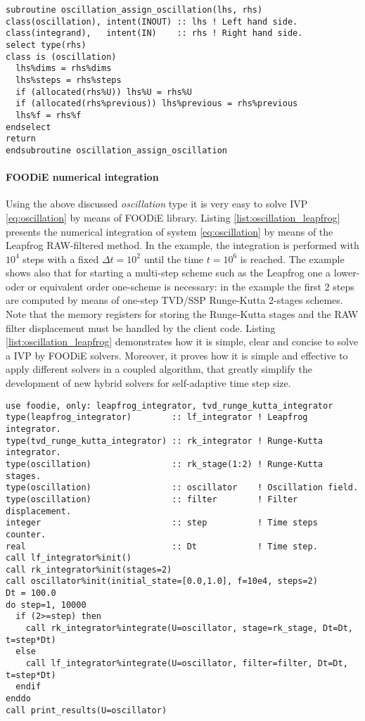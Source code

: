 \documentclass[pdftex,preprint,3p,times,numbers]{elsarticle}
\begin{document}
\begin{lstlisting}[firstnumber=1,style=code,caption={implementation of the \emph{oscillation integrand} assignment},label={list:oscillation_assign}]
subroutine oscillation_assign_oscillation(lhs, rhs)
class(oscillation), intent(INOUT) :: lhs ! Left hand side.
class(integrand),   intent(IN)    :: rhs ! Right hand side.
select type(rhs)
class is (oscillation)
  lhs%dims = rhs%dims
  lhs%steps = rhs%steps
  if (allocated(rhs%U)) lhs%U = rhs%U
  if (allocated(rhs%previous)) lhs%previous = rhs%previous
  lhs%f = rhs%f
endselect
return
endsubroutine oscillation_assign_oscillation
\end{lstlisting}

\paragraph{FOODiE numerical integration}

Using the above discussed \emph{oscillation} type it is very easy to solve IVP \ref{eq:oscillation} by means of FOODiE library. Listing \ref{list:oscillation_leapfrog} presents the numerical integration of system \ref{eq:oscillation} by means of the Leapfrog RAW-filtered method. In the example, the integration is performed with $10^4$ steps with a fixed $\Delta t=10^2$ until the time $t=10^6$ is reached. The example shows also that for starting a multi-step scheme such as the Leapfrog one a lower-oder or equivalent order one-scheme is necessary: in the example the first 2 steps are computed by means of one-step TVD/SSP Runge-Kutta 2-stages schemes. Note that the memory registers for storing the Runge-Kutta stages and the RAW filter displacement must be handled by the client code. Listing \ref{list:oscillation_leapfrog} demonstrates how it is simple, clear and concise to solve a IVP by FOODiE solvers. Moreover, it proves how it is simple and effective to apply different solvers in a coupled algorithm, that greatly simplify the development of new hybrid solvers for self-adaptive time step size.

\begin{lstlisting}[firstnumber=1,style=code,caption={numerical integration of the \emph{oscillation} system by means of Leapfrog RAW-filtered method},label={list:oscillation_leapfrog}]
use foodie, only: leapfrog_integrator, tvd_runge_kutta_integrator
type(leapfrog_integrator)        :: lf_integrator ! Leapfrog integrator.
type(tvd_runge_kutta_integrator) :: rk_integrator ! Runge-Kutta integrator.
type(oscillation)                :: rk_stage(1:2) ! Runge-Kutta stages.
type(oscillation)                :: oscillator    ! Oscillation field.
type(oscillation)                :: filter        ! Filter displacement.
integer                          :: step          ! Time steps counter.
real                             :: Dt            ! Time step.
call lf_integrator%init()
call rk_integrator%init(stages=2)
call oscillator%init(initial_state=[0.0,1.0], f=10e4, steps=2)
Dt = 100.0
do step=1, 10000
  if (2>=step) then
    call rk_integrator%integrate(U=oscillator, stage=rk_stage, Dt=Dt, t=step*Dt)
  else
    call lf_integrator%integrate(U=oscillator, filter=filter, Dt=Dt, t=step*Dt)
  endif
enddo
call print_results(U=oscillator)
\end{lstlisting}
\end{document}
